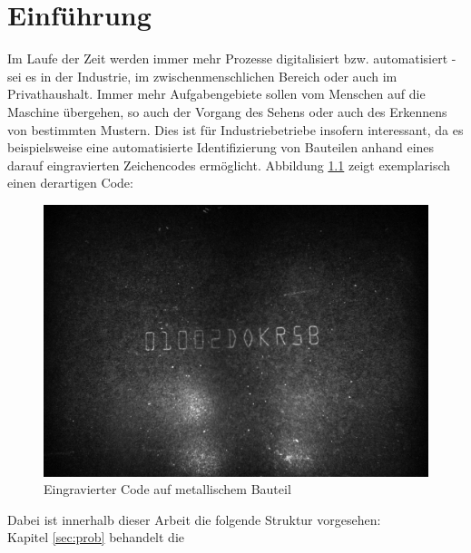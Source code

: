 
\chapter{Einführung}
\label{sec:intro}
	
	Im Laufe der Zeit werden immer mehr Prozesse digitalisiert bzw. 
	automatisiert - sei es in der Industrie, im zwischenmenschlichen 
	Bereich oder auch im Privathaushalt. Immer mehr Aufgabengebiete sollen vom 
	Menschen auf die Maschine übergehen, so auch der Vorgang des Sehens oder 
	auch des Erkennens von bestimmten Mustern. Dies ist für Industriebetriebe 
	insofern interessant, da es beispielsweise eine automatisierte 
	Identifizierung von Bauteilen anhand eines darauf eingravierten 
	Zeichencodes ermöglicht. Abbildung \ref{fig:example-code} zeigt 
	exemplarisch einen derartigen Code:
	\begin{figure}[h]
		\centering
		\includegraphics[width=0.5\linewidth]{beispielcode}
		\caption{Eingravierter Code auf metallischem Bauteil}
		\label{fig:example-code}
	\end{figure}
	
	
	
	Dabei ist innerhalb dieser Arbeit die folgende Struktur vorgesehen: \\
	Kapitel \ref{sec:prob} behandelt die 
